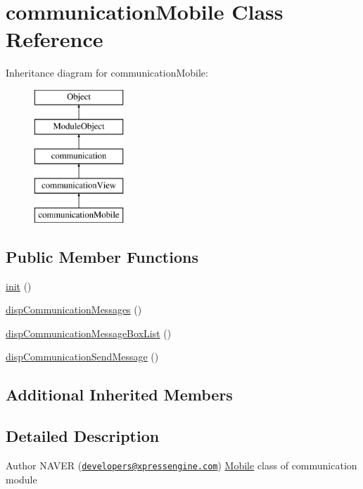 \hypertarget{classcommunicationMobile}{}\section{communication\+Mobile Class Reference}
\label{classcommunicationMobile}
Inheritance diagram for communication\+Mobile\+:\begin{figure}[H]
\begin{center}
\leavevmode
\includegraphics[height=5.000000cm]{classcommunicationMobile}
\end{center}
\end{figure}
\subsection*{Public Member Functions}
\begin{DoxyCompactItemize}
\item 
\hyperlink{classcommunicationMobile_a3fc9dd0a130e004c1fb5895ac6d4c920}{init} ()
\item 
\hyperlink{classcommunicationMobile_a1ff627f6e2111856cc297c2291dca2c7}{disp\+Communication\+Messages} ()
\item 
\hyperlink{classcommunicationMobile_a0f5fde87f62229177aa693fbc51c99d2}{disp\+Communication\+Message\+Box\+List} ()
\item 
\hyperlink{classcommunicationMobile_adb243fe0a373f12d98d472a895e41d7a}{disp\+Communication\+Send\+Message} ()
\end{DoxyCompactItemize}
\subsection*{Additional Inherited Members}


\subsection{Detailed Description}
\begin{DoxyAuthor}{Author}
N\+A\+V\+ER (\href{mailto:developers@xpressengine.com}{\tt developers@xpressengine.\+com}) \hyperlink{classMobile}{Mobile} class of communication module 
\end{DoxyAuthor}


